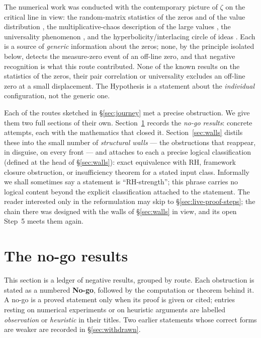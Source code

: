 \documentclass[11pt]{amsart}
\theoremstyle{definition}
\theoremstyle{remark}
\theoremstyle{definition}
\begin{document}
The numerical work was conducted with the contemporary picture of $\zeta$ on the critical line in view:
the random-matrix statistics of the zeros and of the value distribution \cite{KeatingSnaith,FHK}, the
multiplicative-chaos description of the large values \cite{Soundararajan,BondarenkoSeip,SaksmanWebb,RhodesVargas}, the universality phenomenon \cite{Voronin,Bagchi}, and the hyperbolicity/interlacing
circle of ideas \cite{GORZ,MSS,BorceaBranden}. Each is a source of \emph{generic} information about the
zeros; none, by the principle isolated below, detects the measure-zero event of an off-line zero, and that
negative recognition is what this route contributed. None of the known results on the statistics of the zeros, their pair correlation or universality excludes an off-line zero at a small displacement. The Hypothesis is a statement about the \emph{individual}
configuration, not the generic one.

Each of the routes sketched in \S\ref{sec:journey} met a precise obstruction. We give them two full
sections of their own. Section~\ref{sec:nogos} records the \emph{no-go results}: concrete attempts,
each with the mathematics that closed it. Section~\ref{sec:walls} distils these into the small number of
\emph{structural walls} --- the obstructions that reappear, in disguise, on every front --- and attaches
to each a precise logical classification (defined at the head of \S\ref{sec:walls}): exact equivalence
with RH, framework closure obstruction, or insufficiency theorem for a stated input class. Informally we
shall sometimes say a statement is ``RH-strength''; this phrase carries no logical content beyond the
explicit classification attached to the statement. The reader interested only in the
reformulation may skip to \S\ref{sec:live-proof-steps}; the chain there was designed with the walls of
\S\ref{sec:walls} in view, and its open Step~5 meets them again.

\section{The no-go results}\label{sec:nogos}

This section is a ledger of negative results, grouped by route. Each obstruction is stated as a numbered
\textbf{No-go}, followed by the computation or theorem behind it. A no-go is a proved statement only when
its proof is given or cited; entries resting on numerical experiments or on heuristic arguments are
labelled \emph{observation} or \emph{heuristic} in their titles. Two earlier statements whose correct
forms are weaker are recorded in \S\ref{sec:withdrawn}.
\end{document}
